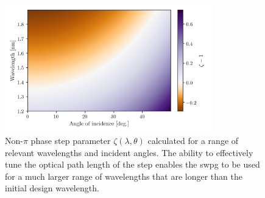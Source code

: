 \begin{figure}
	\centering
	\includegraphics[width=0.8\textwidth]{figures/Two_source/zeta_theta.png}
	\caption{Non-$\pi$ phase step parameter $\zeta(\lambda,\theta)$ calculated for a range of relevant wavelengths and incident angles.  The ability to effectively tune the optical path length of the step enables the \gls{swpg} to be used for a much larger range of wavelengths that are longer than the initial design wavelength.}
	\label{fig:zeta_theta}
\end{figure}

